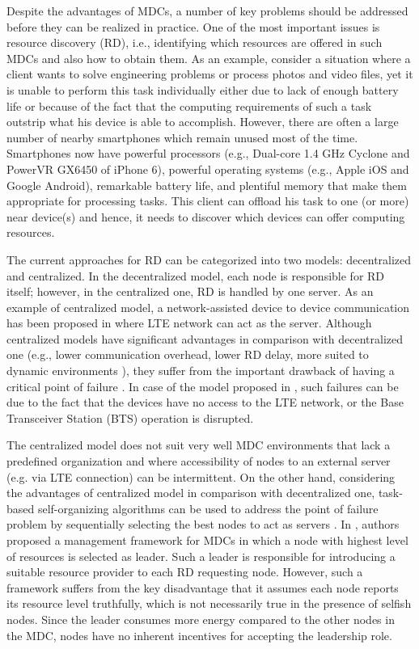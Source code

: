 \documentclass[journal,12pt, onecolumn]{IEEEtran}
\begin{document}
Despite the advantages of MDCs, a number of key problems should be addressed before they can be realized in practice. One of the most important issues is resource discovery (RD), i.e., identifying which resources are offered in such MDCs and also how to obtain them. 
As an example, consider a situation where a client wants to solve engineering problems or process photos and video files, yet it is unable to perform this task individually either due to lack of enough battery life or because of the fact that the computing requirements of such a task outstrip what his device is able to accomplish. However, there are often a large number of nearby smartphones which remain unused most of the time. Smartphones now have powerful processors (e.g., Dual-core 1.4 GHz Cyclone and PowerVR GX6450 of iPhone 6), powerful operating systems (e.g., Apple iOS and Google Android), remarkable battery life, and plentiful memory that make them appropriate for processing tasks.
This client can offload his task to one (or more) near device(s) and hence, it needs to discover which devices can offer computing resources.

The current approaches for RD can be categorized into two models: decentralized and centralized. 
In the decentralized model, each node is responsible for RD itself; however, in the centralized one, RD is handled by one server. As an example of centralized model, a network-assisted device to device communication has been proposed in \cite{x53} where LTE network can act as the server.
Although centralized models have significant advantages in comparison with decentralized one (e.g., lower communication overhead, lower RD delay, more suited to dynamic environments \cite[and references therein]{x14}), they suffer from the important drawback of having a critical point of failure \cite{x14}. In case of the model proposed in \cite{x53}, such failures can be due to the fact that the devices have no access to the LTE network, or the Base Transceiver Station (BTS) operation is disrupted.  


The centralized model does not suit very well MDC environments that lack a predefined organization and where accessibility of nodes to an external server (e.g. via LTE connection) can be intermittent. On the other hand, considering the advantages of centralized model in comparison with decentralized one, task-based self-organizing algorithms can be used to address the point of failure problem by sequentially selecting the best nodes to act as servers \cite{x34}. In \cite{x15}, authors proposed a management framework for MDCs in which a node with highest level of resources is selected as leader. Such a leader is responsible for introducing a suitable resource provider to each RD requesting node. However, such a framework suffers from the key disadvantage that it assumes each node reports its resource level truthfully, which is not necessarily true in the presence of selfish nodes. Since the leader consumes more energy compared to the other nodes in the MDC, nodes have no inherent incentives for accepting the leadership role. 
\end{document}

